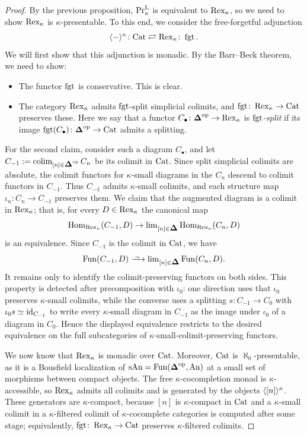 \documentclass[11pt]{book}
\begin{document}
	\begin{proof}
		By the previous proposition, $\textup{Pr}^{\textup{L}}_{\kappa}$ is equivalent to $\operatorname{Rex}_{\kappa}$, so we need to show $\operatorname{Rex}_{\kappa}$ is $\kappa$-presentable. To this end, we consider the free-forgetful adjunction
		\[
			\langle - \rangle^{\kappa}\colon {\textup{Cat}} \rightleftarrows \operatorname{Rex}_{\kappa}\colon \operatorname{fgt}.
		\]
		We will first show that this adjunction is monadic. By the Barr--Beck theorem, we need to show:
		\begin{itemize}
			\item The functor $\operatorname{fgt}$ is conservative. This is clear.
			\item The category $\operatorname{Rex}_{\kappa}$ admits $\operatorname{fgt}$-split simplicial colimits, and $\operatorname{fgt}\colon \operatorname{Rex}_{\kappa} \to {\textup{Cat}}$ preserves these. Here we say that a functor $C_{\bullet}\colon \simp\catop \to \Rex_{\kappa}$ is \emph{$\operatorname{fgt}$-split} if its image $\fgt(C_{\bullet})\colon \simp\catop \to \Cat$ admits a splitting.
		\end{itemize}
		For the second claim, consider such a diagram $C_{\bullet}$, and let $C_{-1} := \colim_{[n] \in \simp\catop} C_n$ be its colimit in ${\textup{Cat}}$. Since split simplicial colimits are absolute, the colimit functors for $\kappa$-small diagrams in the $C_n$ descend to colimit functors in $C_{-1}$. Thus $C_{-1}$ admits $\kappa$-small colimits, and each structure map $\iota_n \colon C_n \to C_{-1}$ preserves them. We claim that the augmented diagram is a colimit in $\operatorname{Rex}_{\kappa}$; that is, for every $D \in \operatorname{Rex}_{\kappa}$ the canonical map
		\[
			\Hom_{\Rex_{\kappa}}(C_{-1}, D) \to \lim_{[n] \in \simp} \Hom_{\Rex_{\kappa}}(C_n,D)
		\]
		is an equivalence. Since $C_{-1}$ is the colimit in ${\textup{Cat}}$, we have
		\[
			\Fun(C_{-1},D) \iso \lim_{[n] \in \simp} \Fun(C_n,D).
		\]
		It remains only to identify the colimit-preserving functors on both sides. This property is detected after precomposition with $\iota_0$: one direction uses that $\iota_0$ preserves $\kappa$-small colimits, while the converse uses a splitting $s \colon C_{-1} \to C_0$ with $\iota_0s \simeq \operatorname{id}_{C_{-1}}$ to write every $\kappa$-small diagram in $C_{-1}$ as the image under $\iota_0$ of a diagram in $C_0$. Hence the displayed equivalence restricts to the desired equivalence on the full subcategories of $\kappa$-small-colimit-preserving functors.

		We now know that $\operatorname{Rex}_{\kappa}$ is monadic over ${\textup{Cat}}$. Moreover, ${\textup{Cat}}$ is $\aleph_0$-presentable, as it is a Bousfield localization of $\sAn = \Fun(\simp\catop,\An)$ at a small set of morphisms between compact objects. The free $\kappa$-cocompletion monad is $\kappa$-accessible, so $\operatorname{Rex}_{\kappa}$ admits all colimits and is generated by the objects $\langle [n] \rangle^{\kappa}$. These generators are $\kappa$-compact, because $[n]$ is $\kappa$-compact in ${\textup{Cat}}$ and a $\kappa$-small colimit in a $\kappa$-filtered colimit of $\kappa$-cocomplete categories is computed after some stage; equivalently, $\operatorname{fgt}\colon \operatorname{Rex}_{\kappa} \to {\textup{Cat}}$ preserves $\kappa$-filtered colimits.
	\end{proof}
\end{document}
